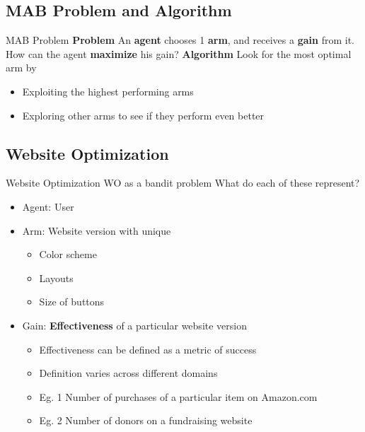 \documentclass{beamer}
\begin{document}
\subsection{MAB Problem and Algorithm}
\begin{frame}{MAB Problem}
\textbf{Problem}
\newline An \textbf{agent} chooses 1 \textbf{arm}, and receives a \textbf{gain} from it.
\newline How can the agent \textbf{maximize} his gain?
\newline
\newline \textbf{Algorithm}
\newline Look for the most optimal arm by
\begin{itemize}
  \item Exploiting the highest performing arms
  \item Exploring other arms to see if they perform even better
\end{itemize}
\end{frame}

\subsection{Website Optimization}
\begin{frame}{Website Optimization}
WO as a bandit problem
\newline
\newline What do each of these represent?
\begin{itemize}
  \item Agent: User
  \item Arm: Website version with unique
	\begin{itemize}
		\item Color scheme
		\item Layouts
		\item Size of buttons
	\end{itemize}
  \item Gain: \textbf{Effectiveness} of a particular website version
	\begin{itemize}
		\item Effectiveness can be defined as a metric of success 
		\item Definition varies across different domains
		\item Eg. 1 Number of purchases of a particular item on Amazon.com
		\item Eg. 2 Number of donors on a fundraising website
	\end{itemize}
\end{itemize}
\end{frame}
\end{document}
